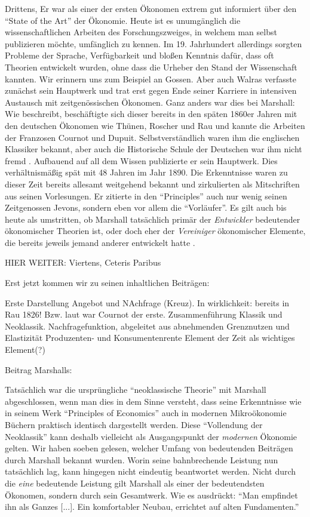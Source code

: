Drittens, Er war als einer der ersten Ökonomen extrem gut informiert über den "`State of the Art"' der Ökonomie. Heute ist es unumgänglich die wissenschaftlichen Arbeiten des Forschungszweiges, in welchem man selbst publizieren möchte, umfänglich zu kennen. Im 19. Jahrhundert allerdings sorgten Probleme der Sprache, Verfügbarkeit und bloßen Kenntnis dafür, dass oft Theorien entwickelt wurden, ohne dass die Urheber den Stand der Wissenschaft kannten. Wir erinnern uns zum Beispiel an Gossen. Aber auch Walras verfasste zunächst sein Hauptwerk und trat erst gegen Ende seiner Karriere in intensiven Austausch mit zeitgenössischen Ökonomen. Ganz anders war dies bei Marshall: Wie \textcite{Groenewegen1995} beschreibt, beschäftigte sich dieser bereits in den späten 1860er Jahren mit den deutschen Ökonomen wie Thünen, Roscher und Rau und kannte die Arbeiten der Franzosen Cournot und Dupuit. Selbstverständlich waren ihm die englischen Klassiker bekannt, aber auch die Historische Schule der Deutschen war ihm nicht fremd \parencite[S. 140]{Rieter1989}. Aufbauend auf all dem Wissen publizierte er sein Hauptwerk. Dies verhältnismäßig spät mit 48 Jahren im Jahr 1890. Die Erkenntnisse waren zu dieser Zeit bereits allesamt weitgehend bekannt und zirkulierten als Mitschriften aus seinen Vorlesungen. Er zitierte in den "`Principles"' auch nur wenig seinen Zeitgenossen Jevons, sondern eben vor allem die "`Vorläufer"'. Es gilt auch bis heute als umstritten, ob Marshall tatsächlich primär der \textit{Entwickler} bedeutender ökonomischer Theorien ist, oder doch eher der \textit{Vereiniger} ökonomischer Elemente, die bereits jeweils jemand anderer entwickelt hatte \parencite[S. 207ff]{Ekelund2002}. 

HIER WEITER: 
Viertens, Ceteris Paribus

Erst jetzt kommen wir zu seinen inhaltlichen Beiträgen:
 
Erste Darstellung Angebot und NAchfrage (Kreuz). In wirklichkeit: bereits in Rau 1826! \textcite[S. 159]{Blaug2001} Bzw. laut \textcite{Humphrey1992} war Cournot der erste.
Zusammenführung Klassik und Neoklassik. Nachfragefunktion, abgeleitet aus abnehmenden Grenznutzen und 
Elastizität
Produzenten- und Konsumentenrente
Element der Zeit als wichtiges Element(?)


Beitrag Marshalls: \textcite{Ekelund2002}


Tatsächlich war die ursprüngliche "`neoklassische Theorie"' mit Marshall abgeschlossen, wenn man dies in dem Sinne versteht, dass seine Erkenntnisse wie in seinem Werk "`Principles of Economics"' auch in modernen Mikroökonomie Büchern praktisch identisch dargestellt werden. Diese "`Vollendung der Neoklassik"' kann deshalb vielleicht als Ausgangspunkt der \textit{modernen} Ökonomie gelten.
Wir haben soeben gelesen, welcher Umfang von bedeutenden Beiträgen durch Marshall bekannt wurden. Worin seine bahnbrechende Leistung nun tatsächlich lag, kann hingegen nicht eindeutig beantwortet werden. Nicht durch die \textit{eine} bedeutende Leistung gilt Marshall als einer der bedeutendsten Ökonomen, sondern durch sein Gesamtwerk. Wie \textcite{Rieter1989} es ausdrückt: "`Man empfindet ihn als Ganzes [...]. Ein komfortabler Neubau, errichtet auf alten Fundamenten."' 

